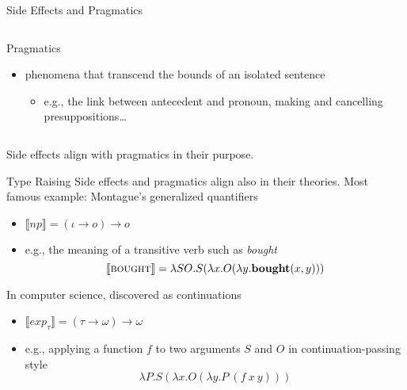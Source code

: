 \documentclass{beamer}
\newcommand{\sem}[1]{\llbracket #1 \rrbracket}
\newcommand{\semdom}[1]{\textbf{#1}}
\begin{document}
\begin{frame}{Side Effects and Pragmatics}
\begin{columns}
\begin{column}{0.5\textwidth}
\begin{block}{Pragmatics}
\begin{itemize}
\begin{itemize}
          \end{itemize}
        \pause \vfill
        \item phenomena that transcend the bounds of an isolated sentence
          \begin{itemize}
          \item e.g., the link between antecedent and pronoun, making and
            cancelling presuppositions\ldots
          \end{itemize}
        \end{itemize}
      \end{block}
    \end{column}
  \end{columns}
  \vfill
  \pause
  \alert{Side effects align with pragmatics in their purpose.}
\end{frame}

\begin{frame}{Type Raising}
  Side effects and pragmatics align also in their theories.
  \pause
  \vfill
  Most famous example: Montague's generalized quantifiers
  \begin{itemize}
  \item $\sem{np} = (\iota \to o) \to o$
  \item e.g., the meaning of a transitive verb such as \textit{bought}
    $$ \sem{\textsc{bought}} = \lambda S O. S (\lambda x. O (\lambda y. \semdom{bought}(x, y))) $$
  \end{itemize}
  \vfill
  \pause
  In computer science, discovered as continuations
  \begin{itemize}
  \item $\sem{exp_{\tau}} = (\tau \to \omega) \to \omega$
  \item e.g., applying a function $f$ to two arguments $S$ and $O$ in
    continuation-passing style
    $$ \lambda P. S (\lambda x. O (\lambda y. P\ (f\ x\ y))) $$
  \end{itemize}
\end{frame}
\end{document}
